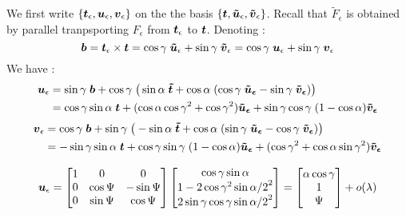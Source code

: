 We first write $\{\boldsymbol{t}_\epsilon, \boldsymbol{u}_\epsilon,\boldsymbol{v}_\epsilon\}$ on the the basis $\{\boldsymbol{t}, \boldsymbol{\tilde{u}}_\epsilon,\boldsymbol{\tilde{v}}_\epsilon\}$. Recall that $\tilde{F}_\epsilon$ is obtained by parallel tranpsporting $F_\epsilon$ from $\boldsymbol{t}_\epsilon$ to $\boldsymbol{t}$. Denoting :
\begin{equation}
	\boldsymbol{b} = \boldsymbol{t}_\epsilon \times \boldsymbol{t} 
	 = \cos{\gamma}\;\boldsymbol{\tilde{u}}_\epsilon + \sin{\gamma}\;\boldsymbol{\tilde{v}}_\epsilon
	 = \cos{\gamma}\;\boldsymbol{u}_\epsilon + \sin{\gamma}\;\boldsymbol{v}_\epsilon
\end{equation}
We have :
\begin{equation}
	\begin{aligned}
	\boldsymbol{u}_\epsilon &= \sin{\gamma}\;\boldsymbol{b} + \cos{\gamma}\;\big(\sin{\alpha}\;\boldsymbol{\tilde{t}}
	+ \cos{\alpha}\;(\cos{\gamma}\;\boldsymbol{\tilde{u}_\epsilon} 
	- \sin{\gamma}\;\boldsymbol{\tilde{v}_\epsilon})\big) \\
	&=\cos{\gamma}\sin{\alpha}\;\boldsymbol{t}
	+ (\cos{\alpha}\cos{\gamma}^2+ \cos{\gamma}^2)\boldsymbol{\tilde{u}_\epsilon} 
	+ \sin{\gamma}\cos{\gamma}\;(1-\cos{\alpha})\boldsymbol{\tilde{v}_\epsilon} 
	\end{aligned}
\end{equation}
\begin{equation}
	\begin{aligned}
	\boldsymbol{v}_\epsilon &= \cos{\gamma}\;\boldsymbol{b} + \sin{\gamma}\;\big(-\sin{\alpha}\;\boldsymbol{\tilde{t}}
	+ \cos{\alpha}\;(\sin{\gamma}\;\boldsymbol{\tilde{u}_\epsilon} 
	- \cos{\gamma}\;\boldsymbol{\tilde{v}_\epsilon})\big) \\
	&=-\sin{\gamma}\sin{\alpha}\;\boldsymbol{t}
	+ \cos{\gamma}\sin{\gamma}\;(1-\cos{\alpha})\boldsymbol{\tilde{u}_\epsilon} 
	+ (\cos{\gamma}^2 + \cos{\alpha}\sin{\gamma}^2)\boldsymbol{\tilde{v}_\epsilon} 
	\end{aligned}
\end{equation}

\begin{equation}
	\boldsymbol{u}_\epsilon =
	\begin{bmatrix}
		1 & 0 & 0 \\
		0 & \cos{\Psi} & -\sin{\Psi} \\
		0 & \sin{\Psi} & \cos{\Psi} 
	\end{bmatrix}
	\begin{bmatrix}
		\cos{\gamma}\sin{\alpha} \\
		1-2\cos{\gamma}^2\sin{\alpha/2}^2 \\
		2\sin{\gamma}\cos{\gamma}\sin{\alpha/2}^2
	\end{bmatrix}
	=
	\begin{bmatrix}
		\alpha\cos{\gamma}\\
		1 \\
		\Psi
	\end{bmatrix}
	+ o(\lambda)
\end{equation}


